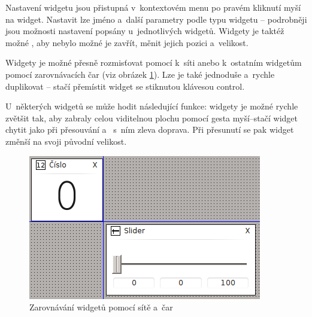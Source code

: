 \documentclass[12pt, a4paper, oneside]{article}
\begin{document}
Nastavení widgetu jsou přistupná v~kontextovém menu po pravém kliknutí myší na widget. Nastavit lze jméno a~další parametry podle typu widgetu -- podrobněji jsou možnosti nastavení popsány u~jednotlivých widgetů. Widgety je taktéž možné , aby nebylo možné je zavřít, měnit jejich pozici a~velikost.

Widgety je možné přesně rozmisťovat pomocí  k~síti anebo k~ostatním widgetům pomocí zarovnávacích čar (viz obrázek \ref{widget_lines}). Lze je také jednoduše a~rychle duplikovat -- stačí přemístit widget se stiknutou klávesou control.

U~některých widgetů se může hodit následující funkce: widgety je možné rychle zvětšit tak, aby zabraly celou viditelnou plochu pomocí gesta myší--stačí widget chytit jako při přesouvání a~ s~ním zleva doprava. Při přesunutí se pak widget změnší na svoji původní velikost.

\begin{figure}[H]
\begin{center}
\includegraphics[scale=1]{img/lines.png}
\caption{Zarovnávání widgetů pomocí sítě a~čar}
\label{widget_lines}
\end{center}
\end{figure}
\end{document}
